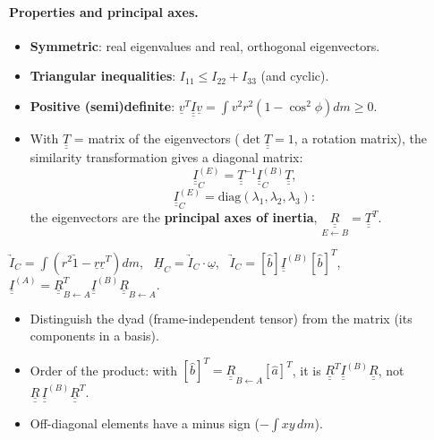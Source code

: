 \paragraph{Properties and principal axes.}
\begin{itemize}
\item \textbf{Symmetric}: real eigenvalues and real, orthogonal eigenvectors.
\item \textbf{Triangular inequalities}: $I_{11}\le I_{22}+I_{33}$ (and cyclic).
\item \textbf{Positive (semi)definite}: $\underline v^T\underline{\underline I}\underline v=\int v^2r^2(1-\cos^2\phi)dm\ge0$.
\item With $\underline{\underline T}$ = matrix of the eigenvectors ($\det\underline{\underline T}=1$, a rotation matrix), the similarity transformation gives a diagonal matrix:
\begin{equation}
\underline{\underline I}_C^{(E)}=\underline{\underline T}^{-1}\underline{\underline I}_C^{(B)}\underline{\underline T},
\end{equation}
\begin{equation}
\underline{\underline I}_C^{(E)}=\mathrm{diag}(\lambda_1,\lambda_2,\lambda_3):
\end{equation}
the eigenvectors are the \textbf{principal axes of inertia}, $\underset{E\leftarrow B}{\underline{\underline R}}=\underline{\underline T}^T$.
\end{itemize}

\begin{keyf}
$\underrightarrow I_C=\int(r^2\underrightarrow1-\underline r\underline r^T)dm$, \ $\underline H_C=\underrightarrow I_C\cdot\underline\omega$, \ $\underrightarrow I_C=[\hat b]\underline{\underline I}^{(B)}[\hat b]^T$, \
$\underline{\underline I}^{(A)}=\underline{\underline R}_{B\leftarrow A}^T\underline{\underline I}^{(B)}\underline{\underline R}_{B\leftarrow A}$.
\end{keyf}

\pitfalls
\begin{itemize}
\item Distinguish the dyad (frame-independent tensor) from the matrix (its components in a basis).
\item Order of the product: with $[\hat b]^T=\underline{\underline R}_{B\leftarrow A}[\hat a]^T$, it is $\underline{\underline R}^T\underline{\underline I}^{(B)}\underline{\underline R}$, not $\underline{\underline R}\,\underline{\underline I}^{(B)}\underline{\underline R}^T$.
\item Off-diagonal elements have a minus sign ($-\int xy\,dm$).
\end{itemize}

